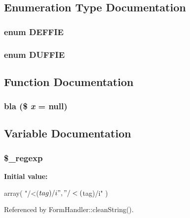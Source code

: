 \subsection{Enumeration Type Documentation}
\subsubsection[{DEFFIE}]{\setlength{\rightskip}{0pt plus 5cm}enum {\bf DEFFIE}}\label{x_8php_a22a59822f87564f3e66e3f14ac2c62f7}
\subsubsection[{DUFFIE}]{\setlength{\rightskip}{0pt plus 5cm}enum {\bf DUFFIE}}\label{x_8php_ad4f22af99a23392da6dce10ee148488d}


\subsection{Function Documentation}
\subsubsection[{bla}]{\setlength{\rightskip}{0pt plus 5cm}bla (\$ {\em x} = {\ttfamily null})}\label{x_8php_ab6cdfa5a880b1653d91c3be35ccb5218}


\subsection{Variable Documentation}
\subsubsection[{\$\_\-regexp}]{\setlength{\rightskip}{0pt plus 5cm}\$\_\-regexp}\label{x_8php_aeb01ec713159369dbfafe73aabc23305}
{\bfseries Initial value:}
\begin{DoxyCode}
 array(
                                         "/<($tag)/i"
                                        ,"/<\/($tag)/i"
                                )
\end{DoxyCode}


Referenced by FormHandler::cleanString().

